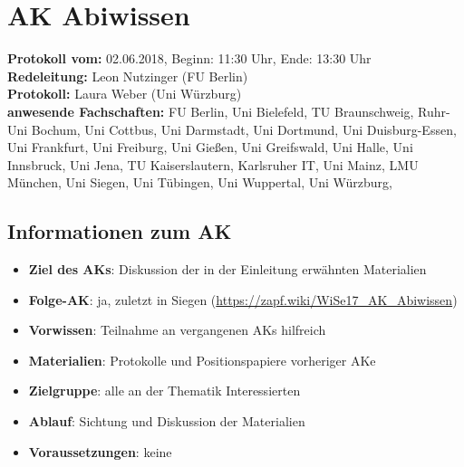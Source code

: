 
\section{AK Abiwissen}

	\textbf{Protokoll vom:} 02.06.2018,
	Beginn: 11:30 Uhr,
	Ende: 13:30 Uhr \\
	\textbf{Redeleitung:} Leon Nutzinger (FU Berlin) \\
	\textbf{Protokoll:} Laura Weber (Uni Würzburg) \\
	\textbf{anwesende Fachschaften:} FU Berlin, Uni Bielefeld, TU Braunschweig, Ruhr-Uni Bochum, Uni Cottbus, Uni Darmstadt, Uni Dortmund, Uni Duisburg-Essen, Uni Frankfurt, Uni Freiburg, Uni Gießen, Uni Greifswald, Uni Halle, Uni Innsbruck, Uni Jena, TU Kaiserslautern, Karlsruher IT, Uni Mainz, LMU München, Uni Siegen, Uni Tübingen, Uni Wuppertal, Uni Würzburg,

	\subsection*{Informationen zum AK}
		\begin{itemize}
			\item \textbf{Ziel des AKs}: Diskussion der in der Einleitung erwähnten Materialien
			\item \textbf{Folge-AK}:  ja, zuletzt in Siegen (\url{https://zapf.wiki/WiSe17_AK_Abiwissen})
			\item \textbf{Vorwissen}: Teilnahme an vergangenen AKs hilfreich
      \item \textbf{Materialien}: Protokolle und Positionspapiere vorheriger AKe
			\item \textbf{Zielgruppe}: alle an der Thematik Interessierten
			\item \textbf{Ablauf}: Sichtung und Diskussion der Materialien
			\item \textbf{Voraussetzungen}: keine
		\end{itemize}

